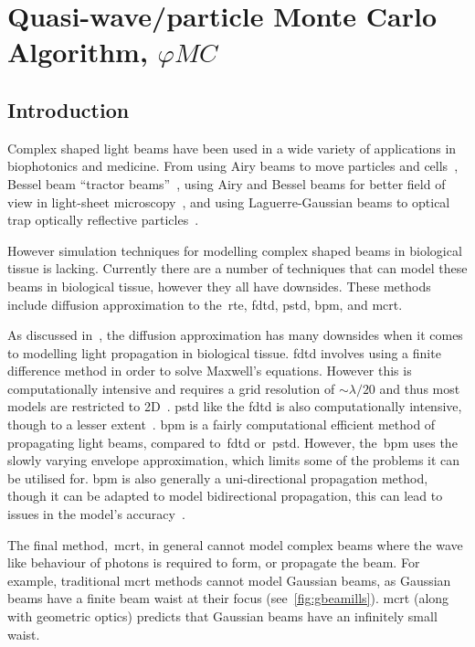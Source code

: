 \chapter{Quasi-wave/particle Monte Carlo Algorithm, \texorpdfstring{$\varphi MC$}{phiMC}}\label{sec:phase}

\section{Introduction}\label{sec:besintro}

Complex shaped light beams have been used in a wide variety of applications in biophotonics and medicine.
From using Airy beams to move particles and cells~\cite{baumgartl2008optically}, Bessel beam ``tractor beams''~\cite{ruffner2012optical}, using Airy and Bessel beams for better field of view in light-sheet microscopy~\cite{vettenburg2014light}, and using Laguerre-Gaussian beams to optical trap optically reflective particles~\cite{simpson1996optical}.


However simulation techniques for modelling complex shaped beams in biological tissue is lacking.
Currently there are a number of techniques that can model these beams in biological tissue, however they all have downsides.
These methods include diffusion approximation to the~\gls*{rte}, \gls*{fdtd}, \gls*{pstd}, \gls*{bpm}, and \gls*{mcrt}.

As discussed in~, the diffusion approximation has many downsides when it comes to modelling light propagation in biological tissue.
\gls*{fdtd} involves using a finite difference method in order to solve Maxwell's equations.
However this is computationally intensive and requires a grid resolution of $\sim \lambda/20$ and thus most models are restricted to 2D~\cite{glaser2016fractal,elmaklizi2015penetration}. 
\gls*{pstd} like the \gls*{fdtd} is also computationally intensive, though to a lesser extent~\cite{glaser2016fractal}.
\gls*{bpm} is a fairly computational efficient method of propagating light beams, compared to~\gls*{fdtd} or~\gls*{pstd}.
However, the~\gls*{bpm} uses the slowly varying envelope approximation, which limits some of the problems it can be utilised for.
\Gls*{bpm} is also generally a uni-directional propagation method, though it can be adapted to model bidirectional propagation, this can lead to issues in the model's accuracy~\cite{van1981beam,glaser2016fractal}.

\medskip

The final method,~\gls*{mcrt}, in general cannot model complex beams where the wave like behaviour of photons is required to form, or propagate the beam.
For example, traditional \gls*{mcrt} methods cannot model Gaussian beams, as Gaussian beams have a finite beam waist at their focus (see~\cref{fig:gbeamills}).
\Gls*{mcrt} (along with geometric optics) predicts that Gaussian beams have an infinitely small waist.

